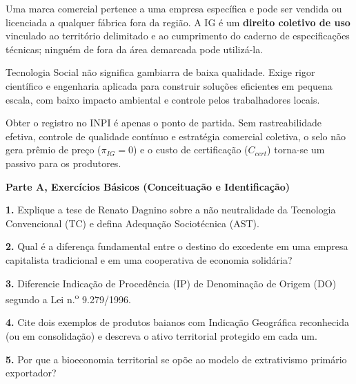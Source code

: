 \begin{boxErro}
Uma marca comercial pertence a uma empresa específica e pode ser vendida ou licenciada a qualquer fábrica fora da região. A IG é um \textbf{direito coletivo de uso} vinculado ao território delimitado e ao cumprimento do caderno de especificações técnicas; ninguém de fora da área demarcada pode utilizá-la.
\end{boxErro}

\begin{boxErro}
Tecnologia Social não significa gambiarra de baixa qualidade. Exige rigor científico e engenharia aplicada para construir soluções eficientes em pequena escala, com baixo impacto ambiental e controle pelos trabalhadores locais.
\end{boxErro}

\begin{boxErro}
Obter o registro no INPI é apenas o ponto de partida. Sem rastreabilidade efetiva, controle de qualidade contínuo e estratégia comercial coletiva, o selo não gera prêmio de preço ($\pi_{IG} = 0$) e o custo de certificação ($C_{cert}$) torna-se um passivo para os produtores.
\end{boxErro}


\textbf{Parte A, Exercícios Básicos (Conceituação e Identificação)}

\textbf{1.} Explique a tese de Renato Dagnino sobre a não neutralidade da Tecnologia Convencional (TC) e defina Adequação Sociotécnica (AST).
\espacoResolucao[1.8cm]

\textbf{2.} Qual é a diferença fundamental entre o destino do excedente em uma empresa capitalista tradicional e em uma cooperativa de economia solidária?
\espacoResolucao[1.8cm]

\textbf{3.} Diferencie Indicação de Procedência (IP) de Denominação de Origem (DO) segundo a Lei n.\textsuperscript{o} 9.279/1996.
\espacoResolucao[1.8cm]

\textbf{4.} Cite dois exemplos de produtos baianos com Indicação Geográfica reconhecida (ou em consolidação) e descreva o ativo territorial protegido em cada um.
\espacoResolucao[1.8cm]

\textbf{5.} Por que a bioeconomia territorial se opõe ao modelo de extrativismo primário exportador?
\espacoResolucao[1.8cm]

